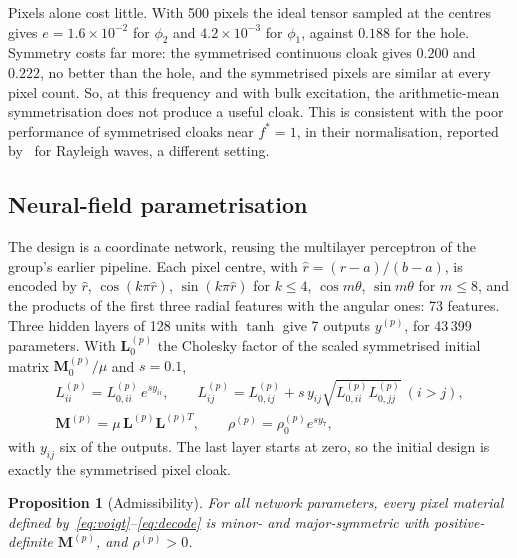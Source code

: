 \documentclass[preprint,12pt]{elsarticle}
\newcommand{\mbf}[1]{\mathbf{#1}}
\newcommand{\be}{\begin{equation}}
\newcommand{\ee}{\end{equation}}
\newtheorem{proposition}{Proposition}
\begin{document}
Pixels alone cost little. With 500 pixels the ideal tensor sampled at the centres gives $e=1.6\times10^{-2}$ for $\phi_2$ and
$4.2\times10^{-3}$ for $\phi_1$, against $0.188$ for the hole. Symmetry costs far more: the symmetrised continuous cloak gives $0.200$
and $0.222$, no better than the hole, and the symmetrised pixels are similar at every pixel count. So, at this frequency and with
bulk excitation, the arithmetic-mean symmetrisation does not produce a useful cloak. This is consistent with the poor
performance of symmetrised cloaks near $f^*=1$, in their normalisation, reported by~\citet{chatzopoulos2023} for Rayleigh waves, a different setting.

\begin{table}[!htb]
\centering\footnotesize
\caption{Pixels and symmetry without optimisation: worst $e$ over two sources and three forces, $f^*=1$.}
\label{tab:s2baseline}

\end{table}

\subsection{Neural-field parametrisation}

The design is a coordinate network, reusing the multilayer perceptron of the group's earlier pipeline. Each pixel centre, with
$\hat{r}=(r-a)/(b-a)$, is encoded by $\hat{r}$, $\cos(k\pi\hat r)$, $\sin(k\pi\hat r)$ for $k\le4$, $\cos m\theta$, $\sin m\theta$ for $m\le8$,
and the products of the first three radial features with the angular ones: 73 features. Three hidden layers of 128 units with
$\tanh$ give 7 outputs $y^{(p)}$, for 43\,399 parameters. With $\mbf{L}_0^{(p)}$ the Cholesky factor of the scaled symmetrised initial
matrix $\mbf{M}_0^{(p)}/\mu$ and $s=0.1$,
\be\label{eq:decode}
\begin{gathered}
L^{(p)}_{ii}=L^{(p)}_{0,ii}\,e^{s y_{ii}},\qquad L^{(p)}_{ij}=L^{(p)}_{0,ij}+s\,y_{ij}\sqrt{L^{(p)}_{0,ii}L^{(p)}_{0,jj}}\ (i>j),\\
\mbf{M}^{(p)}=\mu\,\mbf{L}^{(p)}\mbf{L}^{(p)T},\qquad \rho^{(p)}=\rho_0^{(p)}e^{s y_7},
\end{gathered}
\ee
with $y_{ij}$ six of the outputs. The last layer starts at zero, so the initial design is exactly the symmetrised pixel cloak.

\begin{proposition}[Admissibility]\label{prop:admissible}
For all network parameters, every pixel material defined by~\eqref{eq:voigt}--\eqref{eq:decode} is minor- and major-symmetric
with positive-definite $\mbf{M}^{(p)}$, and $\rho^{(p)}>0$.
\end{proposition}
\end{document}

